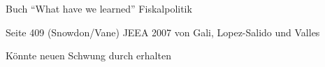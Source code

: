 \textcite[S. 130]{Christiano2018}



Buch "`What have we learned"'
Fiskalpolitik \textcite[S. 131]{Christiano2018}


Seite 409 (Snowdon/Vane)
\parencite{Woodford2011}
JEEA 2007 von Gali, Lopez-Salido und Valles 

Könnte neuen Schwung durch \textcite{Kaplan2018} erhalten



















